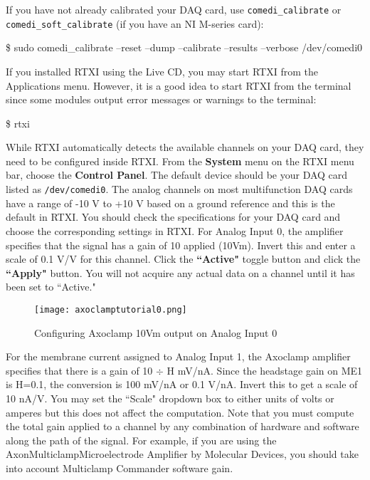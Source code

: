  If you have not already calibrated your DAQ card, use \texttt{comedi\_calibrate} or \texttt{comedi\_soft\_calibrate} (if you have an NI M-series card):
\begin{example}
\$ sudo comedi\_calibrate --reset --dump --calibrate --results --verbose /dev/comedi0
\end{example}
If you installed RTXI using the Live CD, you may start RTXI from the Applications menu. However, it is a good idea to start RTXI from the terminal since some modules output error messages or warnings to the terminal: 
\begin{example}
\$ rtxi
\end{example}
\vspace{1cm}
 While RTXI automatically detects the available channels on your DAQ card, they need to be configured inside RTXI. From the \textbf{System} menu on the RTXI menu bar, choose the \textbf{Control Panel}. The default device should be your DAQ card listed as \texttt{/dev/comedi0}. The analog channels on most multifunction DAQ cards have a range of -10 V to +10 V based on a ground reference and this is the default in RTXI. You should check the specifications for your DAQ card and choose the corresponding settings in RTXI. For Analog Input 0, the amplifier specifies that the signal has a gain of 10 applied (10Vm). Invert this and enter a scale of 0.1 V/V for this channel. Click the \textbf{``Active"} toggle button and click the \textbf{``Apply"} button. You will not acquire any actual data on a channel until it has been set to ``Active."
\begin{figure}[h]
\begin{center}
\texttt{[image: axoclamptutorial0.png]} 
\caption[Axoclamp Tutorial: Analog Input 0]{Configuring Axoclamp 10Vm output on Analog Input 0} 
\end{center}
\label{fig:axoclamptutorial0}
\end{figure}

\newpage For the membrane current assigned to Analog Input 1, the Axoclamp amplifier specifies that there is a gain of 10 $\div$ H mV/nA. Since the headstage gain on ME1 is H=0.1, the conversion is 100 mV/nA or 0.1 V/nA. Invert this to get a scale of 10 nA/V. You may set the ``Scale" dropdown box to either units of volts or amperes but this does not affect the computation. \attention Note that you must compute the total gain applied to a channel by any combination of hardware and software along the path of the signal. For example, if you are using the Axon\tm Multiclamp\tm Microelectrode Amplifier by Molecular Devices, you should take into account Multiclamp Commander software gain.

